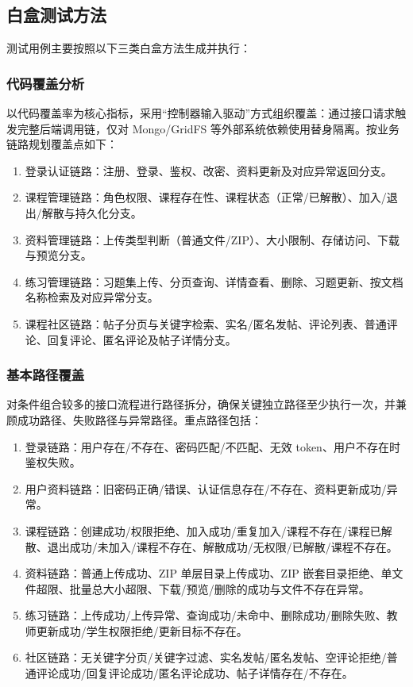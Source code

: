 \documentclass[12pt,a4paper]{ctexart}
\begin{document}
\subsection{白盒测试方法}

测试用例主要按照以下三类白盒方法生成并执行：

\subsubsection{代码覆盖分析}

以代码覆盖率为核心指标，采用“控制器输入驱动”方式组织覆盖：通过接口请求触发完整后端调用链，仅对 Mongo/GridFS 等外部系统依赖使用替身隔离。按业务链路规划覆盖点如下：

\begin{enumerate}
  \item 登录认证链路：注册、登录、鉴权、改密、资料更新及对应异常返回分支。
  \item 课程管理链路：角色权限、课程存在性、课程状态（正常/已解散）、加入/退出/解散与持久化分支。
  \item 资料管理链路：上传类型判断（普通文件/ZIP）、大小限制、存储访问、下载与预览分支。
  \item 练习管理链路：习题集上传、分页查询、详情查看、删除、习题更新、按文档名称检索及对应异常分支。
  \item 课程社区链路：帖子分页与关键字检索、实名/匿名发帖、评论列表、普通评论、回复评论、匿名评论及帖子详情分支。
\end{enumerate}

\subsubsection{基本路径覆盖}

对条件组合较多的接口流程进行路径拆分，确保关键独立路径至少执行一次，并兼顾成功路径、失败路径与异常路径。重点路径包括：

\begin{enumerate}
  \item 登录链路：用户存在/不存在、密码匹配/不匹配、无效 token、用户不存在时鉴权失败。
  \item 用户资料链路：旧密码正确/错误、认证信息存在/不存在、资料更新成功/异常。
  \item 课程链路：创建成功/权限拒绝、加入成功/重复加入/课程不存在/课程已解散、退出成功/未加入/课程不存在、解散成功/无权限/已解散/课程不存在。
  \item 资料链路：普通上传成功、ZIP 单层目录上传成功、ZIP 嵌套目录拒绝、单文件超限、批量总大小超限、下载/预览/删除的成功与文件不存在异常。
  \item 练习链路：上传成功/上传异常、查询成功/未命中、删除成功/删除失败、教师更新成功/学生权限拒绝/更新目标不存在。
  \item 社区链路：无关键字分页/关键字过滤、实名发帖/匿名发帖、空评论拒绝/普通评论成功/回复评论成功/匿名评论成功、帖子详情存在/不存在。
\end{enumerate}
\end{document}
